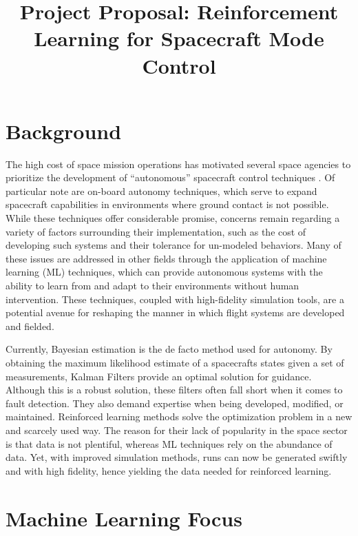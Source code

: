 \documentclass[]{article}
\title{Project Proposal: Reinforcement Learning for Spacecraft Mode Control}
\author{}
\begin{document}
\maketitle

\begin{abstract}

\end{abstract}

\section{Background}

The high cost of space mission operations has motivated several space agencies to prioritize the development of ``autonomous'' spacecraft control techniques \cite{Pecheur2000}. Of particular note are on-board autonomy techniques, which serve to expand spacecraft capabilities in environments where ground contact is not possible. While these techniques offer considerable promise, concerns remain regarding a variety of factors surrounding their implementation, such as the cost of developing such systems and their tolerance for un-modeled behaviors\cite{Starek2016}. Many of these issues are addressed in other fields through the application of machine learning (ML) techniques, which can provide autonomous systems with the ability to learn from and adapt to their environments without human intervention. These techniques, coupled with high-fidelity simulation tools, are a potential avenue for reshaping the manner in which flight systems are developed and fielded. 

Currently, Bayesian estimation is the de facto method used for autonomy. By obtaining the maximum likelihood estimate of a spacecrafts states given a set of measurements, Kalman Filters provide an optimal solution for guidance. Although this is a robust solution, these filters often fall short when it comes to fault detection. They also demand expertise when being developed, modified, or maintained. Reinforced learning methods solve the optimization problem in a new and scarcely used way. The reason for their lack of popularity in the space sector is that data is not plentiful, whereas ML techniques rely on the abundance of data. Yet, with improved simulation methods, runs can now be generated swiftly and with high fidelity, hence yielding the data needed for reinforced learning. 

\section{Machine Learning Focus}
\end{document}
